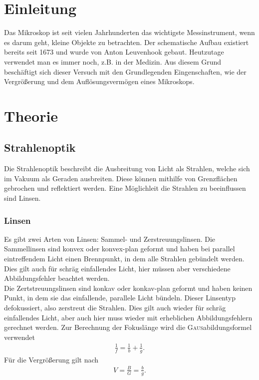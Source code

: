 \documentclass[12pt,a4paper,titlepage,headinclude]{scrartcl}
\numberwithin{equation}{subsection}
\newcommand{\person}[1]{\textsc{#1}}
\begin{document}
\cleardoublepage
\tableofcontents
\thispagestyle{empty}
\cleardoublepage

\setcounter{footnote}{0}
\setcounter{page}{1}


\newpage

\section{Einleitung}
\label{sec:einleitung}
Das Mikroskop ist seit vielen Jahrhunderten das wichtigste Messinstrument, wenn es darum geht, kleine Objekte zu betrachten.
Der schematische Aufbau existiert bereits seit 1673 und wurde von Anton Leuvenhook gebaut.
Heutzutage verwendet man es immer noch, z.B. in der Medizin.
Aus diesem Grund beschäftigt sich dieser Versuch mit den Grundlegenden Eingenschaften, wie der Vergrößerung und dem Auflösungsvermögen eines Mikroskops.

\section{Theorie}
\label{sec:theorie}

\subsection{Strahlenoptik}
Die Strahlenoptik beschreibt die Ausbreitung von Licht als Strahlen, welche sich im Vakuum als Geraden ausbreiten.
Diese können mithilfe von Grenzflächen gebrochen und reflektiert werden.
Eine Möglichleit die Strahlen zu beeinflussen sind Linsen.

\subsubsection{Linsen}
Es gibt zwei Arten von Linsen: Sammel- und Zerstreuungslinsen.
Die Sammellinsen sind konvex oder konvex-plan geformt und haben bei parallel eintreffendem Licht einen Brennpunkt, in dem alle Strahlen gebündelt werden.
Dies gilt auch für schräg einfallendes Licht, hier müssen aber verschiedene Abbildungsfehler beachtet werden.\\
Die Zertstreuungslinsen sind konkav oder konkav-plan geformt und haben keinen Punkt, in dem sie das einfallende, parallele Licht bündeln.
Dieser Linsentyp defokussiert, also zerstreut die Strahlen.
Dies gilt auch wieder für schräg einfallendes Licht, aber auch hier muss wieder mit erheblichen Abbildungsfehlern gerechnet werden.
Zur Berechnung der Fokuslänge wird die \person{Gaus}abildungsformel verwendet \cite[279]{demtroeder2} 
\begin{align}
	\frac{1}{f}=\frac{1}{b}+\frac{1}{g}.\label{eq:gaus}
\end{align}
Für die Vergrößerung gilt nach \cite[280]{demtroeder2}
\begin{align}
	V=\frac{B}{G}=\frac{b}{g}.\label{eq:vergr}
\end{align}
\end{document}
